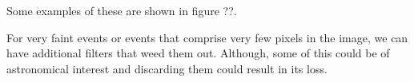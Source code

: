 Some examples of these are shown in figure ??.

For very faint events or events that comprise very few pixels in the image, we can have additional filters that weed them out. Although, some of this could be of astronomical interest and discarding them could result in its loss.



\begin{comment}
	* Our test-drive with OIS + ML. Results of paper (hopefully)
		* Test data we used (CSTAR)
		* Processing our raw data (selecting images for a dataset, cleaning images, fixing headers, performing subtractions, identifying sources in subtractions, stamps)
		* Getting samples for training (labeling data as RB, winnow, first run of ML)
		* Feature exploration of data (SExtractor features, derived features, morphological features like Zernike, Chebyshev, Fourier, etc.)
		* Random Forest + SMOTE + Cost Matrix (how well did this perform?)
		* Is it reproducible in other data sets?
\end{comment}


